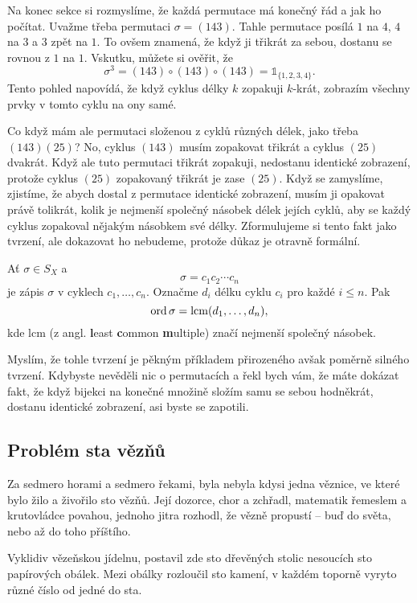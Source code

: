 Na konec sekce si rozmyslíme, že každá permutace má konečný řád a jak ho
počítat. Uvažme třeba permutaci $\sigma = (143)$. Tahle permutace posílá $1$ na
$4$, $4$ na $3$ a $3$ zpět na $1$. To ovšem znamená, že když ji 
třikrát za sebou, dostanu se rovnou z $1$ na $1$. Vskutku, můžete si ověřit, že
\[
 \sigma^3 = (143) \circ (143) \circ (143) = \mathds{1}_{\{1,2,3,4\}}.
\]
Tento pohled napovídá, že když cyklus délky $k$ zopakuji $k$-krát, zobrazím
všechny prvky v tomto cyklu na ony samé.

Co když mám ale permutaci složenou z cyklů různých délek, jako třeba
$(143)(25)$? No, cyklus $(143)$ musím zopakovat třikrát a cyklus $(25)$ dvakrát.
Když ale tuto permutaci třikrát zopakuji, nedostanu identické zobrazení, protože
cyklus $(25)$ zopakovaný třikrát je zase $(25)$. Když se zamyslíme, zjistíme, že
abych dostal z permutace identické zobrazení, musím ji opakovat právě tolikrát,
kolik je nejmenší společný násobek délek jejích cyklů, aby se každý cyklus
zopakoval nějakým násobkem své délky. Zformulujeme si tento fakt jako tvrzení,
ale dokazovat ho nebudeme, protože důkaz je otravně formální.

\begin{claim}
 Ať $\sigma \in S_X$ a
 \[
  \sigma = c_1c_2\cdots c_n
 \]
 je zápis $\sigma$ v cyklech $c_1,\ldots,c_n$. Označme $d_i$ délku cyklu $c_i$ 
 pro každé $i \leq n$. Pak
 \[
  \operatorname{ord} \sigma = \mathrm{lcm}(d_1,\ldots,d_n),
 \]
 kde $\mathrm{lcm}$ (z angl. \textbf{l}east \textbf{c}ommon \textbf{m}ultiple)
 značí nejmenší společný násobek.
\end{claim}

Myslím, že tohle tvrzení je pěkným příkladem přirozeného avšak poměrně silného
tvrzení. Kdybyste nevěděli nic o permutacích a řekl bych vám, že máte dokázat
fakt, že když bijekci na konečné množině složím samu se sebou hodněkrát, dostanu
identické zobrazení, asi byste se zapotili.

\subsection{Problém sta vězňů}
\label{sssec:problem-sta-veznu}

Za sedmero horami a sedmero řekami, byla nebyla kdysi jedna věznice, ve které
bylo žilo a živořilo sto vězňů. Její dozorce, chor a zchřadl, matematik řemeslem
a krutovládce povahou, jednoho jitra rozhodl, že vězně propustí -- buď do světa,
nebo až do toho příštího.

Vyklidiv vězeňskou jídelnu, postavil zde sto dřevěných stolic nesoucích sto
papírových obálek. Mezi obálky rozloučil sto kamení, v každém toporně vyryto
různé číslo od jedné do sta.

